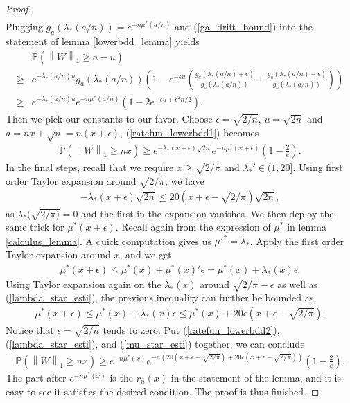 \documentclass[10pt]{article}
\newcommand{\p}{\mathbb{P}}
\newcommand{\norm}[1]{\left\lVert#1\right\rVert}
\newenvironment{Proof of lemma}{\noindent{\bf Proof of Lemma}}{\hfill$\Box$\newline}
\newenvironment{Proof of claim}{\noindent{\bf Proof of claim}}{\hfill$\Box$\newline}
\newenvironment{Proof of theorem}{\noindent{\bf Proof of Theorem}}{\hfill\scriptsize{$\Box$}\newline}
\newenvironment{Proof of theorems}{\noindent{\bf Proof of Theorems}}{\hfill$\Box$\newline}
\newenvironment{Proof of proposition}{\noindent{\bf Proof of Proposition}}{\hfill$\Box$\newline}
\newenvironment{Proof of propositions}{\noindent{\bf Proof of Propositions}}{\hfill$\Box$\newline}
\newenvironment{Proof of exercise}{\noindent{\it Proof of Exercise:}}{\hfill$\Box$}
\numberwithin{equation}{section}
\begin{document}
\begin{proof}
\begin{align}
    \end{align}
    Plugging $g_a(\lambda_*(a/n)) = e^{-n\mu^*(a/n)}$ and (\ref{ga_drift_bound}) into the statement of lemma \ref{lowerbdd_lemma} yields
    \begin{align} \label{ratefun_lowerbdd1}
        &\p(\norm{W}_1 \geq a-u)  \nonumber \\
        \geq &e^{-\lambda_*(a/n) u} g_a(\lambda_*(a/n))\left(1-e^{-\epsilon u}\left(\frac{g_a(\lambda_*(a/n)+\epsilon)}{g_a(\lambda_*(a/n))}+\frac{g_a(\lambda_*(a/n)-\epsilon)}{g_a(\lambda_*(a/n))}\right)\right) \nonumber \\
        \geq &e^{-\lambda_*(a/n) u} e^{-n\mu^*(a/n)}\left(1-2e^{-\epsilon u + \epsilon^2 n/2}\right).
    \end{align}
    Then we pick our constants to our favor. Choose $\epsilon = \sqrt{2/n}$, $u = \sqrt{2n}$ and $a =nx+\sqrt{n} = n(x+\epsilon)$, (\ref{ratefun_lowerbdd1}) becomes
    \begin{align} \label{ratefun_lowerbdd2}
        \p(\norm{W}_1 \geq nx) \geq e^{-\lambda_*(x+\epsilon)\sqrt{2n}}e^{-n \mu^*(x+\epsilon)}\left(1 - \frac{2}{e}\right).
    \end{align}
    In the final steps, recall that we require $x \geq \sqrt{2/\pi}$ and $\lambda_*' \in (1,20]$. Using first order Taylor expansion around $\sqrt{2/\pi}$, we have
    \begin{align} \label{lambda_star_esti}
        -\lambda_*(x+\epsilon)\sqrt{2n} \leq 20(x+\epsilon-\sqrt{2/\pi}) \sqrt{2n},
    \end{align}
    as $\lambda_*(\sqrt{2/\pi)} = 0$ and the first in the expansion vanishes. We then deploy the same trick for $\mu^*(x+\epsilon)$. Recall again from the expression of $\mu^*$ in lemma \ref{calculus_lemma}. A quick computation gives us $\mu'^* = \lambda_*$. Apply the first order Taylor expansion around $x$, and we get
    \begin{align}
        \mu^*(x+\epsilon) \leq \mu^*(x) + \mu^*(x)'\epsilon = \mu^*(x) + \lambda_*(x) \epsilon.
    \end{align}
    Using Taylor expansion again on the $\lambda_*(x)$ around $\sqrt{2/\pi}-\epsilon$ as well as (\ref{lambda_star_esti}), the previous inequality can further be bounded as
    \begin{align} \label{mu_star_esti}
        \mu^*(x+\epsilon) \leq  \mu^*(x) + \lambda_*(x) \epsilon \leq \mu^*(x) +20\epsilon(x+\epsilon-\sqrt{2/\pi}).
    \end{align}
    Notice that $\epsilon = \sqrt{2/n}$ tends to zero. Put (\ref{ratefun_lowerbdd2}), (\ref{lambda_star_esti}), and (\ref{mu_star_esti}) together, we can conclude
    \begin{align}
        \p(\norm{W}_1 \geq nx) \geq e^{-n \mu^*(x)} e^{-n(20(x+\epsilon-\sqrt{2/\pi})+20\epsilon(x+\epsilon-\sqrt{2/\pi}))}\left(1 - \frac{2}{e}\right).
    \end{align}
    The part after $e^{-n \mu^*(x)}$ is the $r_n(x)$ in the statement of the lemma, and it is easy to see it satisfies the desired condition. The proof is thus finished.
\end{proof}
\end{document}
